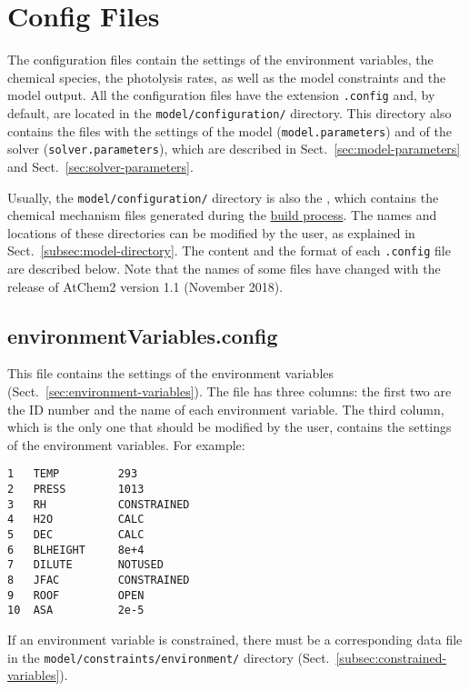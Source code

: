 \section{Config Files} \label{sec:config-files}

The configuration files contain the settings of the environment
variables, the chemical species, the photolysis rates, as well as the
model constraints and the model output. All the configuration files
have the extension \texttt{.config} and, by default, are located in
the \texttt{model/configuration/} directory. This directory also
contains the files with the settings of the model
(\texttt{model.parameters}) and of the solver
(\texttt{solver.parameters}), which are described in
Sect.~\ref{sec:model-parameters} and Sect.~\ref{sec:solver-parameters}.

Usually, the \texttt{model/configuration/} directory is also the
\sharedir, which contains the chemical mechanism files generated
during the \hyperref[subsec:build-process]{build process}. The names
and locations of these directories can be modified by the user, as
explained in Sect.~\ref{subsec:model-directory}. The content and the
format of each \texttt{.config} file are described below. Note that
the names of some files have changed with the release of AtChem2
version 1.1 (November 2018).

\subsection{environmentVariables.config} \label{subsec:environmentvariables}

This file contains the settings of the environment variables
(Sect.~\ref{sec:environment-variables}). The file has three columns:
the first two are the ID number and the name of each
environment variable. The third column, which is the only one that
should be modified by the user, contains the settings of the
environment variables. For example:

\begin{verbatim}
1   TEMP         293
2   PRESS        1013
3   RH           CONSTRAINED
4   H2O          CALC
5   DEC          CALC
6   BLHEIGHT     8e+4
7   DILUTE       NOTUSED
8   JFAC         CONSTRAINED
9   ROOF         OPEN
10  ASA          2e-5
\end{verbatim}

If an environment variable is constrained, there must be a
corresponding data file in the \texttt{model/constraints/environment/}
directory (Sect.~\ref{subsec:constrained-variables}).

